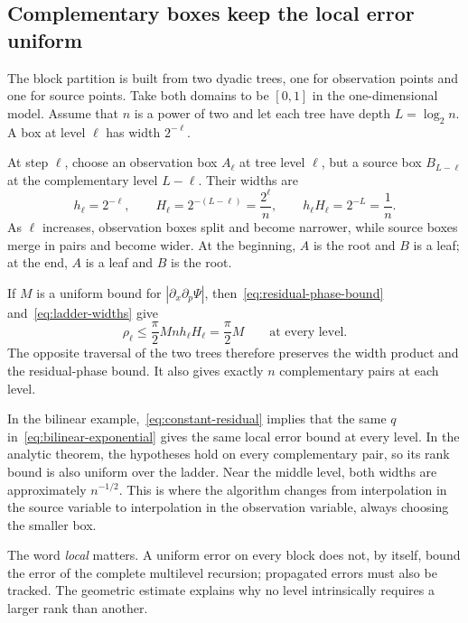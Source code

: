 \documentclass[11pt,a4paper]{article}
\numberwithin{equation}{section}
\begin{document}
\subsection{Complementary boxes keep the local error uniform}
\label{subsec:complementary-boxes}

The block partition is built from two dyadic trees, one for observation points and one for source points. Take both domains to be $[0,1]$ in the one-dimensional model. Assume that $n$ is a power of two and let each tree have depth $L=\log_2 n$. A box at level $\ell$ has width $2^{-\ell}$.

At step $\ell$, choose an observation box $A_\ell$ at tree level $\ell$, but a source box $B_{L-\ell}$ at the complementary level $L-\ell$. Their widths are
\begin{equation}
    h_\ell=2^{-\ell},
    \qquad
    H_\ell=2^{-(L-\ell)}=\frac{2^\ell}{n},
    \qquad
    h_\ell H_\ell=2^{-L}=\frac1n.
    \label{eq:ladder-widths}
\end{equation}
As $\ell$ increases, observation boxes split and become narrower, while source boxes merge in pairs and become wider. At the beginning, $A$ is the root and $B$ is a leaf; at the end, $A$ is a leaf and $B$ is the root.

If $M$ is a uniform bound for $|\partial_x\partial_p\Psi|$, then~\eqref{eq:residual-phase-bound} and~\eqref{eq:ladder-widths} give
\begin{equation}
    \rho_\ell
    \leq \frac{\pi}{2}M n h_\ell H_\ell
    =\frac{\pi}{2}M
    \qquad\text{at every level}.
    \label{eq:constant-residual}
\end{equation}
The opposite traversal of the two trees therefore preserves the width product and the residual-phase bound. It also gives exactly $n$ complementary pairs at each level.

In the bilinear example,~\eqref{eq:constant-residual} implies that the same $q$ in~\eqref{eq:bilinear-exponential} gives the same local error bound at every level. In the analytic theorem, the hypotheses hold on every complementary pair, so its rank bound is also uniform over the ladder. Near the middle level, both widths are approximately $n^{-1/2}$. This is where the algorithm changes from interpolation in the source variable to interpolation in the observation variable, always choosing the smaller box.

The word \emph{local} matters. A uniform error on every block does not, by itself, bound the error of the complete multilevel recursion; propagated errors must also be tracked. The geometric estimate explains why no level intrinsically requires a larger rank than another.
\end{document}
